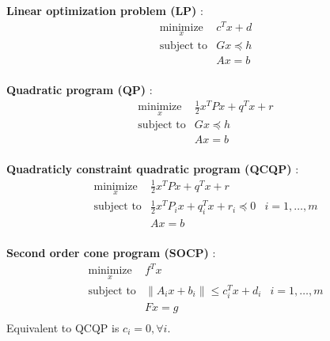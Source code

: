 \documentclass[a4paper, 10pt]{article}
\newcommand{\norm}[1]{\|#1\|}
\newcommand{\itm}[1]{{\color{itmcolor} \textbf{#1}}}
\begin{document}
\begin{multicols}{2}
  \itm{Linear optimization problem (LP)} :
  \begin{displaymath}
    \begin{array}{ll}
      \underset{x}{\text{minimize}} & c^T x + d\\
      \text{subject to} & G x \preceq h\\
                        & A x = b\\
    \end{array}
  \end{displaymath}

  \itm{Quadratic program (QP)} :
  \begin{displaymath}
    \begin{array}{ll}
      \underset{x}{\text{minimize}} & \frac{1}{2} x^T P x + q^T x + r\\
      \text{subject to} & G x \preceq h\\
                        & A x = b\\
    \end{array}
  \end{displaymath}

  \itm{Quadraticly constraint quadratic program (QCQP)} :
  \begin{displaymath}
    \begin{array}{lll}
      \underset{x}{\text{minimize}} & \frac{1}{2} x^T P x + q^T x + r &\\
      \text{subject to} & \frac{1}{2} x^T P_i x + q_i^T x + r_i \preceq 0 & i=1,\dots, m\\
                                    & A x = b&\\
    \end{array}
  \end{displaymath}

  \itm{Second order cone program (SOCP)} :
  \begin{displaymath}
    \begin{array}{lll}
      \underset{x}{\text{minimize}} & f^T x &\\
      \text{subject to} & \norm{A_i x + b_i} \le c_i^T x + d_i & i=1,\dots, m\\
                                    & F x = g&\\
    \end{array}
  \end{displaymath}
  Equivalent to QCQP is $c_i = 0, \forall i$.
\end{multicols}
\end{document}
